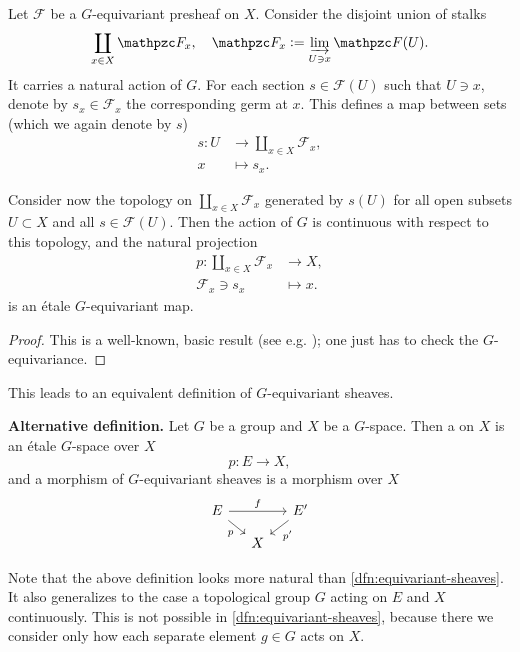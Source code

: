 \begin{proposition}
  Let $\mathcal{F}$ be a $G$-equivariant presheaf on $X$. Consider the disjoint
  union of stalks
  \[ \coprod_{x\in X} \mathcal{F}_x, \quad
    \mathcal{F}_x \dfn \dirlim_{U\ni x} \mathcal{F} (U). \]
  It carries a natural action of $G$. For each section $s\in \mathcal{F} (U)$
  such that $U\ni x$, denote by $s_x \in \mathcal{F}_x$ the corresponding germ
  at $x$. This defines a map between sets (which we again denote by $s$)
  \begin{align*}
    s\colon U & \to \coprod_{x\in X} \mathcal{F}_x,\\
    x & \mapsto s_x.
  \end{align*}

  Consider now the topology on $\coprod_{x\in X} \mathcal{F}_x$ generated by
  $s (U)$ for all open subsets $U \subset X$ and all
  $s\in \mathcal{F} (U)$. Then the action of $G$ is continuous with respect to
  this topology, and the natural projection
  \begin{align*}
    p\colon \coprod_{x\in X} \mathcal{F}_x & \to X,\\
    \mathcal{F}_x \ni s_x & \mapsto x.
  \end{align*}
  is an étale $G$-equivariant map.

  \begin{proof} This is a well-known, basic result
    (see e.g. \cite[Chapter~II]{MacLane-Moerdijk-94}); one just has to check the
    $G$-equivariance.
  \end{proof}
\end{proposition}

This leads to an equivalent definition of $G$-equivariant sheaves.

\begin{nameless}\textbf{Alternative definition.}
  Let $G$ be a group and $X$ be a $G$-space. Then a 
  on $X$ is an étale $G$-space over $X$
  $$p\colon E\to X,$$
  and a morphism of $G$-equivariant sheaves is a morphism over $X$
  \[ \begin{tikzcd}[row sep=small, column sep=small]
      E\ar{rr}{f}\ar{dr}[swap]{p} && E'\ar{dl}{p'} \\
      & X
    \end{tikzcd} \]
\end{nameless}

\begin{remark}
  Note that the above definition looks more natural than
  \ref{dfn:equivariant-sheaves}. It also generalizes to the case a topological
  group $G$ acting on $E$ and $X$ continuously. This is not possible in
  \ref{dfn:equivariant-sheaves}, because there we consider only how each
  separate element $g\in G$ acts on $X$.
\end{remark}

